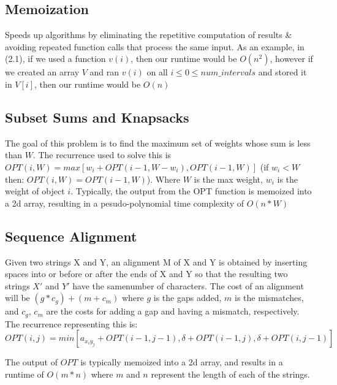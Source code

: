 \documentclass{article}
\begin{document}
\subsection{Memoization}
Speeds up algorithms by eliminating the repetitive computation of results \& avoiding repeated function calls that process the same input.
As an example, in (2.1), if we used a function $v(i)$, then our runtime would be $O(n^2)$, however if we created an array $V$ and ran $v(i)$
on all $i \leq 0 \leq num\_intervals$  and stored it in $V[i]$, then our runtime would be $O(n)$

\subsection{Subset Sums and Knapsacks}
The goal of this problem is to find the maximum set of weights whose sum is less than $W$.
The recurrence used to solve this is $OPT(i, W) = max[w_i + OPT(i - 1, W - w_i), OPT(i-1, W)]$ (if $w_i < W$ then: $OPT(i, W) = OPT(i-1, W)$).
Where $W$ is the max weight, $w_i$ is the weight of object $i$. Typically, the output from the OPT 
function is memoized into a 2d array, resulting in a pesudo-polynomial time complexity of $O(n * W)$

\subsection{Sequence Alignment}
Given two strings X and Y, an alignment M of X and Y is obtained by inserting spaces into or
before or after the ends of X and Y so that the resulting two strings $X'$ and $Y'$  have the samenumber of characters.
The cost of an alignment will be $(g * c_g) + (m + c_m)$ where $g$ is the gaps added, $m$ is the mismatches, and $c_g$, $c_m$
are the costs for adding a gap and having a mismatch, respectively.
The recurrence representing this is: $OPT(i, j) = min[a_{x_iy_j} + OPT(i - 1, j - 1),\delta + OPT(i - 1, j), \delta + OPT(i, j - 1)]$

\noindent The output of $OPT$ is typically memoized into a 2d array, and results in a runtime of $O(m * n)$ where $m$ and $n$ represent
the length of each of the strings.
\end{document}
